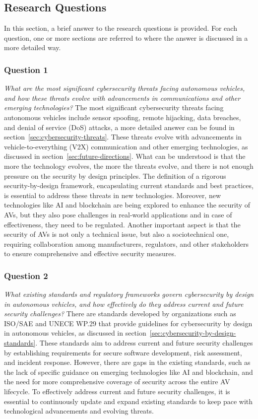 \subsection{Research Questions}\label{subsec:research-questions}
In this section, a brief answer to the research questions is provided.
For each question, one or more sections are referred to where the answer is discussed in a more detailed way.

\subsubsection{Question 1}
\textit{What are the most significant cybersecurity threats facing autonomous vehicles, and how these threats evolve with advancements in communications and other emerging technologies?}
The most significant cybersecurity threats facing autonomous vehicles include sensor spoofing, remote hijacking, data breaches, and denial of service (DoS) attacks,
a more detailed answer can be found in section~\ref{sec:cybersecurity-threats}.
These threats evolve with advancements in vehicle-to-everything (V2X) communication and other emerging technologies, as discussed in section~\ref{sec:future-directions}.
What can be understood is that the more the technology evolves, the more the threats evolve, and there is not enough pressure on the security by design principles.
The definition of a rigorous security-by-design framework, encapsulating current standards and best practices, is essential to address these threats in new technologies.
Moreover, new technologies like AI and blockchain are being explored to enhance the security of AVs, but they also pose challenges in real-world applications and in case of effectiveness, they need to be regulated.
Another important aspect is that the security of AVs is not only a technical issue, but also a sociotechnical one, requiring collaboration among manufacturers, regulators, and other stakeholders to ensure comprehensive and effective security measures.

\subsubsection{Question 2}
\textit{What existing standards and regulatory frameworks govern cybersecurity by design in autonomous vehicles, and how effectively do they address current and future security challenges?}
There are standards developed by organizations such as ISO/SAE and UNECE WP.29 that provide guidelines for cybersecurity by design in autonomous vehicles, as discussed in section~\ref{sec:cybersecurity-by-design-standards}.
These standards aim to address current and future security challenges by establishing requirements for secure software development, risk assessment, and incident response.
However, there are gaps in the existing standards, such as the lack of specific guidance on emerging technologies like AI and blockchain, and the need for more comprehensive coverage of security across the entire AV lifecycle.
To effectively address current and future security challenges, it is essential to continuously update and expand existing standards to keep pace with technological advancements and evolving threats.

